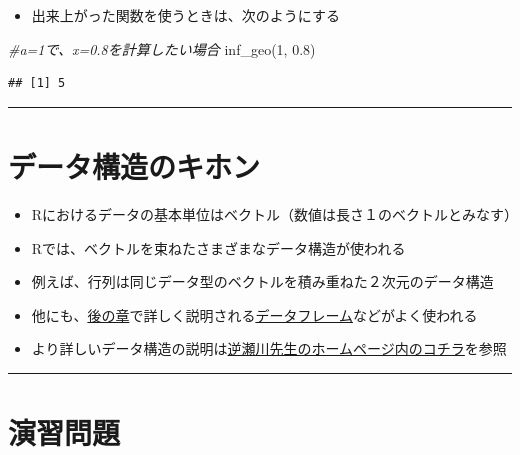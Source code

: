 \documentclass[
]{book}
\newenvironment{Shaded}{\begin{snugshade}}{\end{snugshade}}
\newcommand{\CommentTok}[1]{\textcolor[rgb]{0.56,0.35,0.01}{\textit{#1}}}
\newcommand{\DecValTok}[1]{\textcolor[rgb]{0.00,0.00,0.81}{#1}}
\newcommand{\FloatTok}[1]{\textcolor[rgb]{0.00,0.00,0.81}{#1}}
\newcommand{\FunctionTok}[1]{\textcolor[rgb]{0.00,0.00,0.00}{#1}}
\newcommand{\NormalTok}[1]{#1}
\providecommand{\tightlist}{%
  \setlength{\itemsep}{0pt}\setlength{\parskip}{0pt}}
\begin{document}
\begin{itemize}
\tightlist
\item
  出来上がった関数を使うときは、次のようにする
\end{itemize}

\begin{Shaded}
\begin{Highlighting}[]
\CommentTok{\#a=1で、x=0.8を計算したい場合}
\FunctionTok{inf\_geo}\NormalTok{(}\DecValTok{1}\NormalTok{, }\FloatTok{0.8}\NormalTok{)}
\end{Highlighting}
\end{Shaded}

\begin{verbatim}
## [1] 5
\end{verbatim}

\begin{center}\rule{0.5\linewidth}{0.5pt}\end{center}

\hypertarget{ux30c7ux30fcux30bfux69cbux9020ux306eux30adux30dbux30f3}{%
\section{データ構造のキホン}\label{ux30c7ux30fcux30bfux69cbux9020ux306eux30adux30dbux30f3}}

\begin{itemize}
\tightlist
\item
  Rにおけるデータの基本単位はベクトル（数値は長さ１のベクトルとみなす）
\item
  Rでは、ベクトルを束ねたさまざまなデータ構造が使われる
\item
  例えば、行列は同じデータ型のベクトルを積み重ねた２次元のデータ構造
\item
  他にも、\protect\hyperlink{ux30c7ux30fcux30bfux30d5ux30ecux30fcux30e0}{後の章}で詳しく説明される\protect\hyperlink{ux30c7ux30fcux30bfux30d5ux30ecux30fcux30e0}{データフレーム}などがよく使われる
\item
  より詳しいデータ構造の説明は\href{http://www.f.waseda.jp/sakas/R/Rdata.html}{逆瀬川先生のホームページ内のコチラ}を参照
\end{itemize}

\begin{center}\rule{0.5\linewidth}{0.5pt}\end{center}

\hypertarget{ux6f14ux7fd2ux554fux984c-2}{%
\section{演習問題}\label{ux6f14ux7fd2ux554fux984c-2}}
\end{document}
